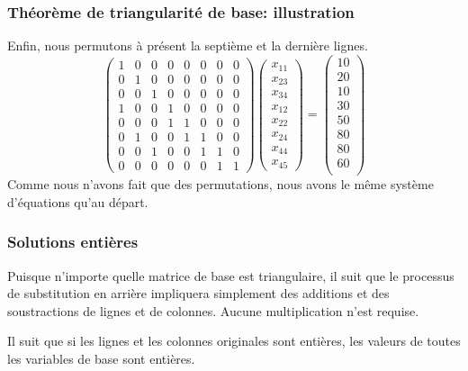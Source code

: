 \documentclass[usepdftitle=false, aspectratio=169]{beamer}
\begin{document}
\begin{frame}
\frametitle{Théorème de triangularité de base: illustration}

Enfin, nous permutons à présent la septième et la dernière lignes.
\[
\begin{pmatrix}
 1 & 0 & 0 & 0 & 0 & 0 & 0 & 0 \\
 0 & 1 & 0 & 0 & 0 & 0 & 0 & 0 \\
 0 & 0 & 1 & 0 & 0 & 0 & 0 & 0 \\
 1 & 0 & 0 & 1 & 0 & 0 & 0 & 0 \\
 0 & 0 & 0 & 1 & 1 & 0 & 0 & 0 \\
 0 & 1 & 0 & 0 & 1 & 1 & 0 & 0 \\
 0 & 0 & 1 & 0 & 0 & 1 & 1 & 0 \\
 0 & 0 & 0 & 0 & 0 & 0 & 1 & 1
\end{pmatrix}
\begin{pmatrix}
x_{11} \\
x_{23} \\
x_{34} \\
x_{12} \\
x_{22} \\
x_{24} \\
x_{44} \\
x_{45}
\end{pmatrix}
=
\begin{pmatrix}
10 \\
20 \\
10 \\
30 \\
50 \\
80 \\
80 \\
60 \\
\end{pmatrix}
\]
Comme nous n'avons fait que des permutations, nous avons le même système d'équations qu'au départ.

\end{frame}

\begin{frame}
\frametitle{Solutions entières}

Puisque n'importe quelle matrice de base est triangulaire, il suit que le processus de substitution en arrière impliquera simplement des additions et des soustractions de lignes et de colonnes. Aucune multiplication n'est requise.

\mbox{}

Il suit que si les lignes et les colonnes originales sont entières, les valeurs de toutes les variables de base sont entières.

\end{frame}
\end{document}
